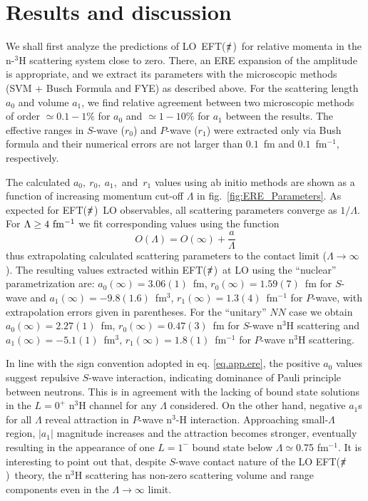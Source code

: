 \documentclass[5p,times]{elsarticle}
\newcommand{\eftnopi}{\mbox{EFT($\slashed{\pi}$) }}
\begin{document}
\section{Results and discussion}

We shall first analyze the predictions of LO~\eftnopi for relative momenta in the n-$^3$H scattering system close to zero.
There, an ERE expansion of the amplitude is appropriate, and we extract its parameters with the microscopic methods 
(SVM + Busch Formula and FYE) as described above. 
For the scattering length $a_0$ and volume $a_1$,
we find relative agreement between two microscopic methods of order $\simeq 0.1-1 \%$ for $a_0$ and $\simeq 1-10\%$ for $a_1$ between the results. 
The effective ranges in $S$-wave ($r_0$) and $P$-wave ($r_1$) were extracted only via Bush formula and their numerical errors are not larger than $0.1$~fm and $0.1$~fm$^{-1}$, respectively.

The calculated $a_0,~r_0,~a_1$,~and~$r_1$ values using ab initio methods are shown as a function of increasing momentum cut-off $\Lambda$ in fig.~\ref{fig:ERE_Parameters}. 
As expected for \eftnopi LO observables, all scattering parameters converge as $1/\Lambda$. For $\Lambda \geq 4~{\rm fm^{-1}}$ we fit corresponding values using the function
\begin{equation}
    O(\Lambda) = O(\infty) +\frac{a}{\Lambda}
    \label{extrapolation}
\end{equation}
thus extrapolating calculated scattering parameters to the contact limit ($\Lambda \rightarrow \infty$). 
The resulting values extracted within \eftnopi at LO using the ``nuclear'' parametrization are: $a_0(\infty) = 3.06(1)$~fm, $r_0(\infty) = 1.59(7)$~fm for $S$-wave and $a_1(\infty) = -9.8(1.6)$~fm$^3$, $r_1(\infty) = 1.3(4)$~fm$^{-1}$ for $P$-wave, with extrapolation errors given in parentheses.
For the ``unitary'' $NN$ case we obtain $a_0(\infty) = 2.27(1)$~fm, $r_0(\infty) = 0.47(3)$~fm for $S$-wave n$^3$H scattering and $a_1(\infty) = -5.1(1)$~fm$^3$, $r_1(\infty) = 1.8(1)$~fm$^{-1}$ for $P$-wave n$^3$H scattering. 
%

%
In line with the sign convention adopted in eq. \ref{eq.app.ere}, the positive $a_0$ values suggest repulsive $S$-wave interaction, indicating dominance of Pauli principle between neutrons. 
This is in agreement with the lacking of bound state solutions in the $L=0^+$ n$^3$H channel for any $\Lambda$ considered. On the other hand, negative $a_1$s for all $\Lambda$ reveal attraction in $P$-wave n$^3$-H interaction. Approaching small-$\Lambda$ region, $|a_1|$ magnitude increases and the attraction becomes stronger, eventually resulting in the appearance of one $L=1^-$ bound state below $\Lambda\simeq$0.75 fm$^{-1}$. 
It is interesting to point out that, despite $S$-wave contact nature of the LO \eftnopi theory, the n$^3$H scattering has non-zero scattering volume and range components even in the $\Lambda \rightarrow \infty$ limit.
%
\end{document}
